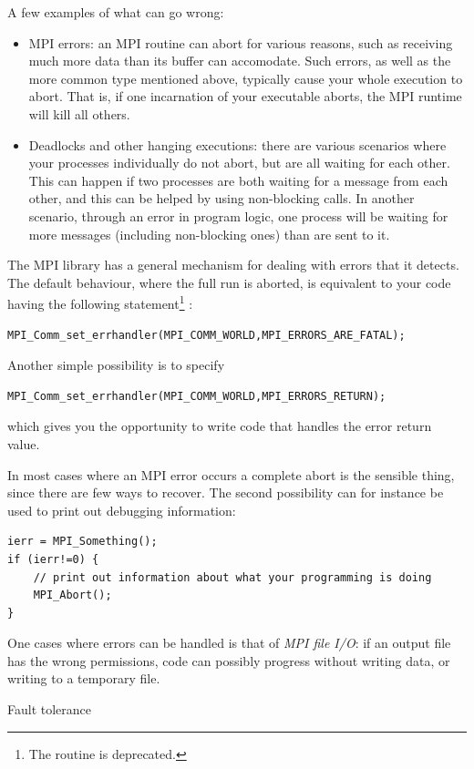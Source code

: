 A few examples of what can go wrong:
\begin{itemize}
\item MPI errors: an MPI routine can abort for various reasons, such
  as receiving much more data than its buffer can accomodate. Such
  errors, as well as the more common type mentioned above, typically
  cause your whole execution to abort. That is, if one incarnation of
  your executable aborts, the MPI runtime will kill all others.
\item Deadlocks and other hanging executions: there are various
  scenarios where your processes individually do not abort, but are all
  waiting for each other. This can happen if two processes are both
  waiting for a message from each other, and this can be helped by
  using non-blocking calls. In another scenario, through an error in
  program logic, one process will be waiting for more messages
  (including non-blocking ones) than are sent to it.
\end{itemize}

The MPI library has a general mechanism for dealing with errors that
it detects. The default behaviour, where the full run is aborted, is
equivalent to your code having the following statement\footnote{The
  routine  is deprecated.}  :
\begin{verbatim}
MPI_Comm_set_errhandler(MPI_COMM_WORLD,MPI_ERRORS_ARE_FATAL);
\end{verbatim}
Another simple possibility is to specify
\begin{verbatim}
MPI_Comm_set_errhandler(MPI_COMM_WORLD,MPI_ERRORS_RETURN);
\end{verbatim}
which gives you the opportunity to write code that handles the error
return value.

In most cases where an MPI error occurs a complete abort is the
sensible thing, since there are few ways to recover. The second
possibility can for instance be used to print out debugging
information:
\begin{verbatim}
ierr = MPI_Something();
if (ierr!=0) {
    // print out information about what your programming is doing
    MPI_Abort();
}
\end{verbatim}
One cases where errors can be handled is that of \emph{MPI file
  I/O}: if an output file has the wrong
permissions, code can possibly progress without writing data, or
writing to a temporary file.

 {Fault tolerance}
\label{mpi:tolerant}


